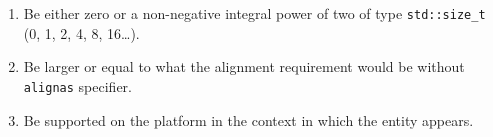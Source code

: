 \begin{enumerate}
\item{Be either zero or a non-negative integral power of two of type \lstinline!std::size_t! (0, 1, 2, 4, 8, 16\dots).}
\item{Be larger or equal to what the alignment requirement would be without \lstinline!alignas! specifier.}
\item{Be supported on the platform in the context in which the entity appears.}
\end{enumerate}

